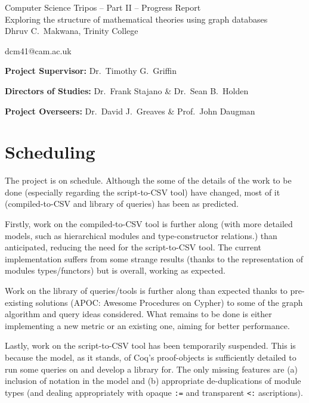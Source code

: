 \documentclass[12pt]{article}
\begin{document}
\begin{center}
\Large
Computer Science Tripos -- Part II -- Progress Report\\[4mm]
\LARGE
Exploring the structure of mathematical theories using graph databases\\[4mm]

\large
Dhruv C.~Makwana, Trinity College

dcm41@cam.ac.uk

\end{center}

\vspace{5mm}

\textbf{Project Supervisor:} Dr.~Timothy G.~Griffin

\textbf{Directors of Studies:} Dr.~Frank Stajano \& Dr.~Sean B.~Holden

\textbf{Project Overseers:} Dr.~David J.~Greaves  \& Prof.~John Daugman

\section*{Scheduling}

The project is on schedule. Although the some of the details of the work to be
done (especially regarding the script-to-CSV tool) have changed, most of it
(compiled-to-CSV and library of queries) has been as predicted.

Firstly, work on the compiled-to-CSV tool is further along (with more detailed
models, such as hierarchical modules and type-constructor relations.) than
anticipated, reducing the need for the script-to-CSV tool. The current
implementation suffers from some strange results (thanks to the representation
of modules types/functors) but is overall, working as expected.

Work on the library of queries/tools is further along than expected thanks to
pre-existing solutions (APOC: Awesome Procedures on Cypher) to some of the
graph algorithm and query ideas considered. What remains to be done is either
implementing a new metric or an existing one, aiming for better performance.

Lastly, work on the script-to-CSV tool has been temporarily suspended. This is
because the model, as it stands, of Coq's proof-objects is sufficiently detailed
to run some queries on and develop a library for. The only missing features are
(a) inclusion of notation in the model and (b) appropriate de-duplications of
module types (and dealing appropriately with opaque \texttt{:=} and
transparent \texttt{<:} ascriptions).
\end{document}
